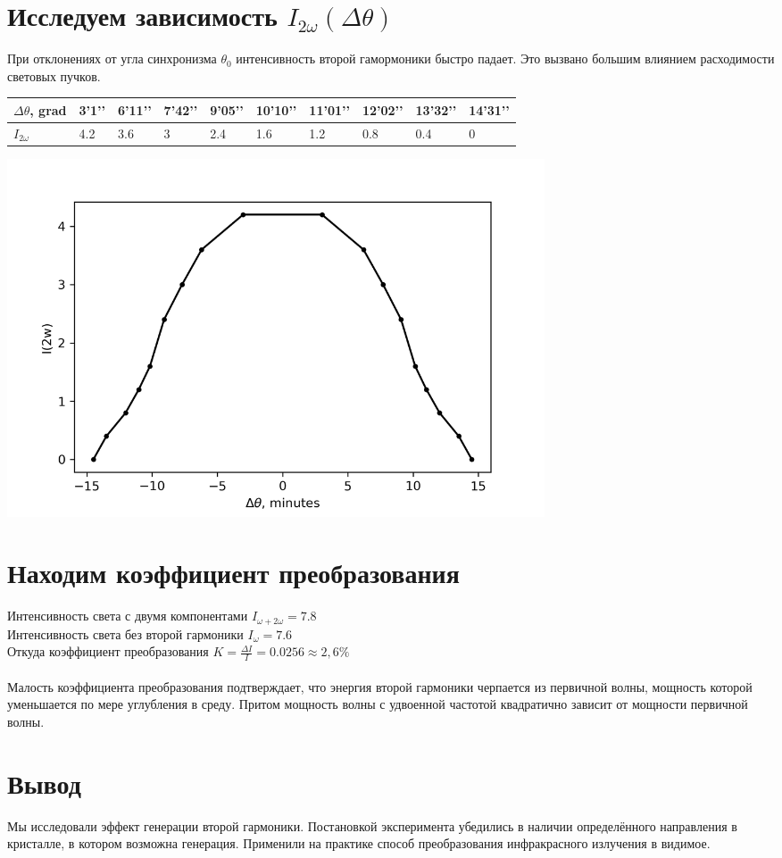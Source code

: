 \documentclass[a4paper,10pt]{extarticle} %
\begin{document}
\section{Исследуем зависимость $I_{2\omega} (\Delta \theta)$}
При отклонениях от угла синхронизма $\theta_0$ интенсивность второй гамормоники быстро падает. Это вызвано большим влиянием расходимости световых пучков.

\begin{table}[H]
\begin{tabular}{|l|l|l|l|l|l|l|l|l|l|}
\hline
$\Delta \theta$, grad & 3’1’’ & 6’11’’ & 7’42’’ & 9’05’’ & 10’10’’ & 11’01’’ & 12’02’’ & 13’32’’ & 14’31’’ \\ \hline
$I_{2 \omega}$           & 4.2   & 3.6    & 3      & 2.4    & 1.6     & 1.2     & 0.8     & 0.4     & 0       \\ \hline
\end{tabular}
\end{table}

\begin{center}
\includegraphics[width = 0.7\textwidth]{images/plot_2}
\end{center}

\section{Находим коэффициент преобразования}
Интенсивность света с двумя компонентами $I_{\omega + 2 \omega} = 7.8$\\
Интенсивность света без второй гармоники $I_{\omega} = 7.6$\\
Откуда коэффициент преобразования   $K = \frac{\Delta I}{I} = 0.0256 \approx 2,6 \%$\\\\
Малость коэффициента преобразования подтверждает, что энергия второй гармоники черпается из первичной волны, мощность которой уменьшается по мере углубления в среду.
Притом мощность волны с удвоенной частотой квадратично зависит от мощности первичной волны.
\section{Вывод}
Мы исследовали эффект генерации второй гармоники. Постановкой эксперимента убедились в наличии определённого направления в кристалле, в котором возможна генерация. Применили на практике способ преобразования инфракрасного излучения в видимое.
\end{document}
